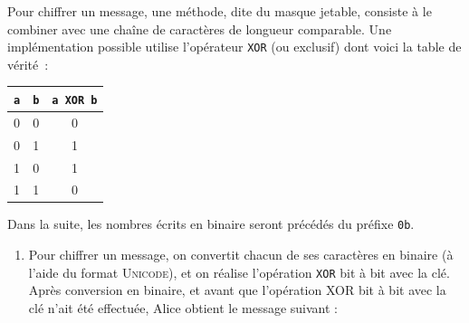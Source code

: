 \documentclass[a5paper,12pt,french]{book}
\begin{document}
\begin{exercice}
     Pour chiffrer un message, une méthode, dite du masque jetable, consiste à le combiner avec une chaîne de caractères de longueur comparable.
     Une implémentation possible utilise l’opérateur \texttt{XOR} (ou exclusif) dont voici la table de vérité :
    \begin{center}
    	\begin{tabular}{|c|c|c|}
                \hline
                \rowcolor{UGLiOrange} \textbf{\color{white}\texttt{a} }& \textbf{\color{white}\texttt{b}} & \textbf{\color{white}\texttt{a XOR b} }  \\
                \hline
                0 & 0 & 0 \\
                \hline
                0 & 1 & 1 \\
                \hline
                1 & 0 & 1 \\
                \hline
                1 & 1 & 0 \\
                \hline
                \end{tabular}
                \end{center}
   	Dans la suite, les nombres écrits en binaire seront précédés du préfixe \texttt{0b}.
       \begin{enumerate}[\bfseries 1.]
       	\item Pour chiffrer un message, on convertit chacun de ses caractères en binaire (à l’aide du format \textsc{Unicode}), et on réalise l’opération \texttt{XOR} bit à bit avec la clé.\\

                Après conversion en binaire, et avant que l’opération XOR bit à bit avec la clé n’ait été effectuée, Alice obtient le message suivant :


\end{enumerate}
\end{exercice}
\end{document}
